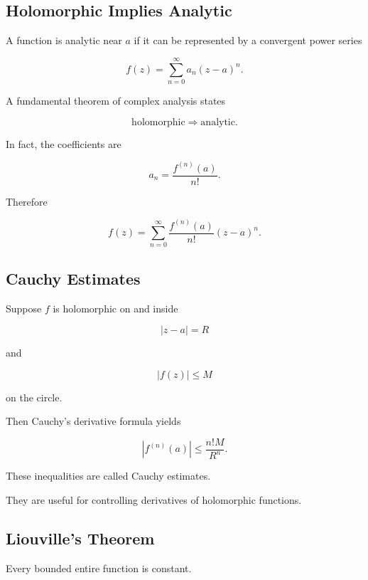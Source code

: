 \subsection{Holomorphic Implies Analytic}
\label{subsec:holomorphic-implies-analytic}

A function is analytic near \(a\) if it can be represented by a convergent
power series

\[
\boxed{
f(z)
=
\sum_{n=0}^{\infty}
a_n(z-a)^n.
}
\]

A fundamental theorem of complex analysis states

\[
\boxed{
\text{holomorphic}
\Longrightarrow
\text{analytic}.
}
\]

In fact, the coefficients are

\[
\boxed{
a_n
=
\frac{f^{(n)}(a)}{n!}.
}
\]

Therefore

\[
\boxed{
f(z)
=
\sum_{n=0}^{\infty}
\frac{f^{(n)}(a)}{n!}
(z-a)^n.
}
\]

\subsection{Cauchy Estimates}
\label{subsec:cauchy-estimates}

Suppose \(f\) is holomorphic on and inside

\[
|z-a|=R
\]

and

\[
|f(z)|\leq M
\]

on the circle.

Then Cauchy's derivative formula yields

\[
\boxed{
|f^{(n)}(a)|
\leq
\frac{n!M}{R^n}.
}
\]

These inequalities are called Cauchy estimates.

They are useful for controlling derivatives of holomorphic functions.

\subsection{Liouville's Theorem}
\label{subsec:liouvilles-theorem}

\begin{theorem}
Every bounded entire function is constant.
\end{theorem}

